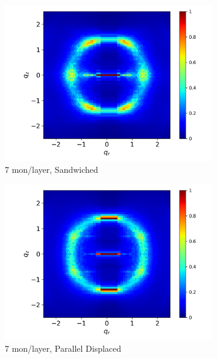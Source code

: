 \documentclass{article}
\begin{document}
\begin{figure}
\begin{subfigure}{0.40\textwidth}
                \includegraphics[width=\textwidth]{rzplot_layered_7.png}
                \caption{7 mon/layer, Sandwiched}\label{fig:rzplot_layered_7}
        \end{subfigure}
        \begin{subfigure}{0.40\textwidth}
                \centering
                \includegraphics[width=\textwidth]{rzplot_offset_7.png}
                \caption{7 mon/layer, Parallel Displaced}\label{fig:rzplot_offset_7}
        \end{subfigure}
        \begin{subfigure}{0.40\textwidth}
                \centering

\end{subfigure}
\end{figure}
\end{document}
